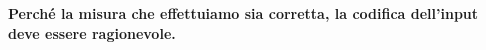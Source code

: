 \textbf{Perché la misura che effettuiamo sia corretta, la codifica dell'input deve essere ragionevole.} \\


